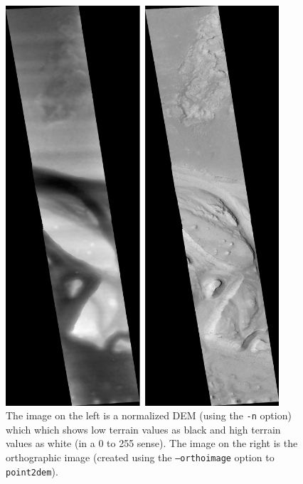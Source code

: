 \begin{figure}
\begin{minipage}{4in}
\includegraphics[width=4in]{images/p19-norm_ortho.png}
\end{minipage}
\hfill
\begin{minipage}{2.7in}
\caption[P19 Normalized DEM and Orthophoto]{
    \label{p19-norm_ortho}
	The image on the left is a normalized DEM (using the
	\texttt{-n} option) which which shows low terrain values
	as black and high terrain values as white (in a 0 to 255
	sense).  The image on the right is the orthographic image
	(created using the \texttt{--orthoimage} option to
	\texttt{point2dem}).
    }
\end{minipage} \end{figure}

% 

